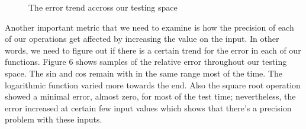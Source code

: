\begin{figure}[!tbh]
 \centering  
  \caption{The error trend accross our testing space }
   \label{fig:fill_geo3}
\end{figure}

Another important metric that we need to examine is how the precision of each of our operations get affected by increasing the value on the input. In other words, we need to figure out if there is a certain trend for the error in each of our functions. Figure 6 shows samples of the relative error throughout our testing space. The sin and cos remain with in the same range most of the time. The logarithmic function varied more towards the end. Also the square root operation showed a minimal error, almost zero, for most of the test time; nevertheless, the error increased at certain few input values which shows that there's a precision problem with these inputs.



